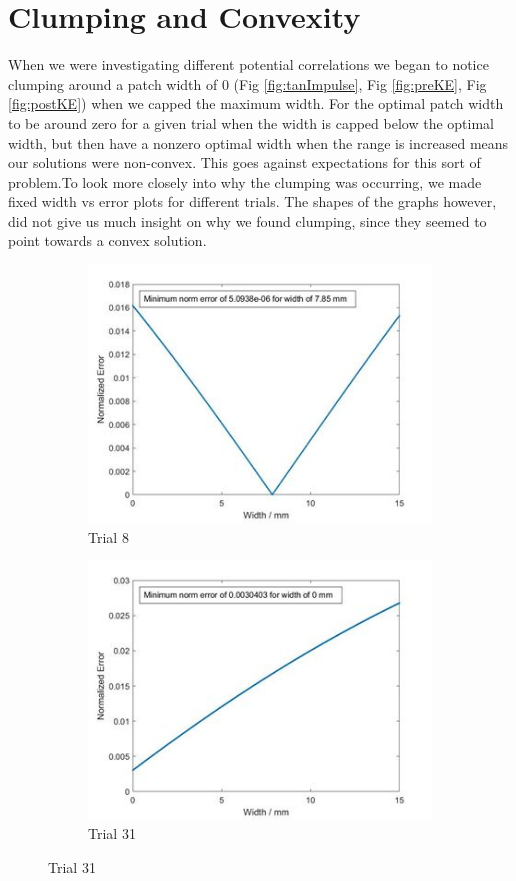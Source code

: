 \documentclass{article}
\begin{document}
\newpage

\section{Clumping and Convexity}
When we were investigating different potential correlations we began to notice clumping around a patch width of 0 (Fig \ref{fig:tanImpulse}, Fig \ref{fig:preKE}, Fig \ref{fig:postKE}) when we capped the maximum width. For the optimal patch width to be around zero for a given trial when the width is capped below the optimal width, but then have a nonzero optimal width when the range is increased means our solutions were non-convex. This goes against expectations for this sort of problem.To look more closely into why the clumping was occurring, we made fixed width vs error plots for different trials. The shapes of the graphs however, did not give us much insight on why we found clumping, since they seemed to point towards a convex solution. 

\begin{figure}[ht]
  \centering
  \caption{Set Width vs Error Plots for Individual Trials}
  \begin{subfigure}[b]{0.4\linewidth}
    \includegraphics[scale=0.4]{Nat1.jpg}
    \caption{Trial 8}
    \label{fig:cov1}
  \end{subfigure}
  \begin{subfigure}[b]{0.4\linewidth}
    \includegraphics[scale=0.4]{Nat2.jpg}
    \caption{Trial 31}
    \label{fig:cov2}
  \end{subfigure}
\end{figure}
\end{document}
